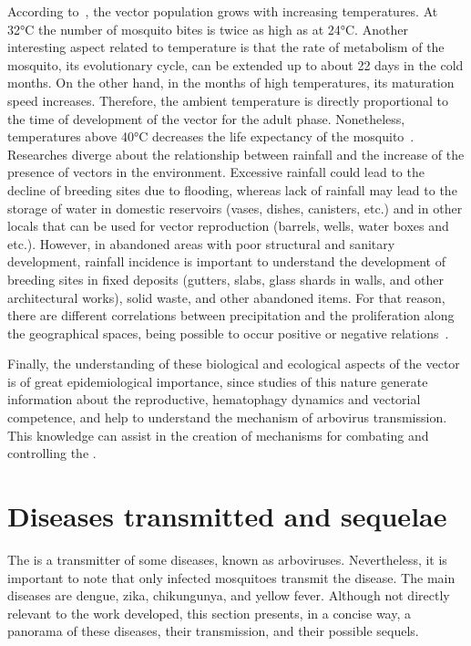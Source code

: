 According to~\cite{focks1995simulation}, the vector population grows with increasing temperatures. At 32°C the number of mosquito bites is twice as high as at 24°C.
Another interesting aspect related to temperature is that the rate of metabolism of the mosquito, its evolutionary cycle, can be extended up to about 22 days in the cold months.
On the other hand, in the months of high temperatures, its maturation speed increases.
Therefore, the ambient temperature is directly proportional to the time of development of the vector for the adult phase.
Nonetheless, temperatures above 40°C decreases the life expectancy of the mosquito~\cite{patz1998dengue}.
Researches diverge about the relationship between rainfall and the increase of the presence of vectors in the environment.
Excessive rainfall could lead to the decline of breeding sites due to flooding, whereas lack of rainfall may lead to the storage of water in domestic reservoirs (vases, dishes, canisters, etc.) and in other locals that can be used for vector reproduction (barrels, wells, water boxes and etc.).
However, in abandoned areas with poor structural and sanitary development, rainfall incidence is important to understand the development of breeding sites in fixed deposits (gutters, slabs, glass shards in walls, and other architectural works), solid waste, and other abandoned items.
For that reason, there are different correlations between precipitation and the \Aedes proliferation along the geographical spaces, being possible to occur positive or negative relations~\cite{arcari2007regional}.

Finally, the understanding of these biological and ecological aspects of the vector is of great epidemiological importance, since studies of this nature generate information about the reproductive, hematophagy dynamics and vectorial competence, and help to understand the mechanism of arbovirus transmission.
This knowledge can assist in the creation of mechanisms for combating and controlling the \Aedes.



\section{Diseases transmitted and sequelae}
%
The \Aedes is a transmitter of some diseases, known as arboviruses.
Nevertheless, it is important to note that only infected mosquitoes transmit the disease.
The main diseases are dengue, zika, chikungunya, and yellow fever.
Although not directly relevant to the work developed, this section presents, in a concise way, a panorama of these diseases, their transmission, and their possible sequels.

